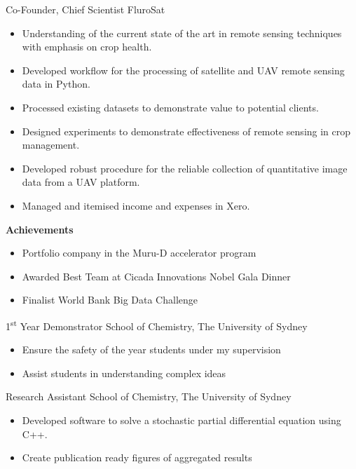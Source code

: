 {Co-Founder, Chief Scientist}
{FluroSat}{}{}
{%
  \begin{itemize}
    \item Understanding of the current state of the art in remote sensing techniques with emphasis on crop health.
    \item Developed workflow for the processing of satellite and UAV remote sensing data in Python.
    \item Processed existing datasets to demonstrate value to potential clients.
    \item Designed experiments to demonstrate effectiveness of remote sensing in crop management.
    \item Developed robust procedure for the reliable collection of quantitative image data from a UAV platform.
    \item Managed and itemised income and expenses in Xero.
  \end{itemize}
  \textbf{Achievements}
  \begin{itemize}
    \item Portfolio company in the Muru-D accelerator program
    \item Awarded Best Team at Cicada Innovations Nobel Gala Dinner
    \item Finalist World Bank Big Data Challenge
  \end{itemize}
}
\vspace{1em}

{1\textsuperscript{st} Year Demonstrator}
{School of Chemistry, The University of Sydney}
{}{}
{%
    \begin{itemize}
      \item Ensure the safety of the  year students under my supervision
      \item Assist students in understanding complex ideas
    \end{itemize}
}
\vspace{1em}

{Research Assistant}
{School of Chemistry, The University of Sydney}
{}{}{%
  \begin{itemize}
    \item Developed software to solve a stochastic partial differential equation using C++.
    \item Create publication ready figures of aggregated results
  \end{itemize}
}
\vspace{1em}


